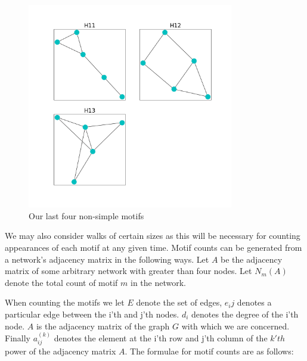\begin{figure}
    \includegraphics[width=9cm]{Images/motif_set_three.png}
    \centering
    \caption{Our last four non-simple motifs}
\end{figure}

\FloatBarrier

We may also consider walks of certain sizes as this will be necessary for 
counting appearances of each motif at any given time. Motif counts can be generated from a network's adjacency matrix in the following ways. Let $A$
be the adjacency matrix of some arbitrary network with greater than four nodes. Let $N_m(A)$ denote 
the total count of motif $m$ in the network. 

\vspace{3mm}

When counting the motifs we let $E$ denote the set of edges, $e_ij$ denotes a particular edge between the 
i'th and j'th nodes. $d_i$ denotes the degree of the i'th node. $A$ is the adjacency matrix of the 
graph $G$ with which we are concerned. Finally $a^{(k)}_{ij}$ denotes the element at the i'th row and j'th 
column of the $k'th$ power of the adjacency matrix $A$. The formulae for motif counts are as follows:

\newpage

